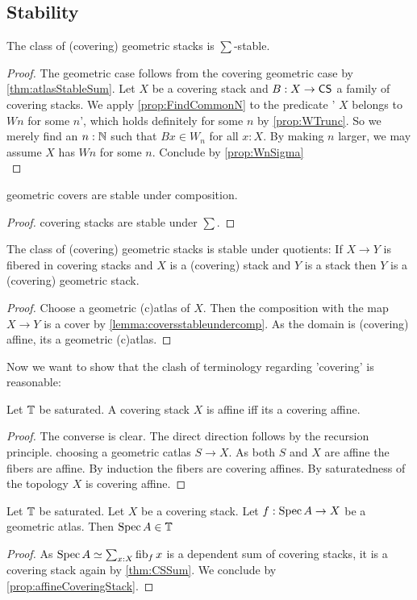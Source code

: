 \subsection{Stability}
\begin{theorem}{\label{thm:CSSum}}
	The class of (covering) geometric stacks is $\sum$-stable.
\end{theorem}
\begin{proof}
	The geometric case follows from the covering geometric case by \ref{thm:atlasStableSum}.
	Let $X$ be a covering stack and $B : X \to \mathsf{CS}$ a family of covering stacks.
	We apply \ref{prop:FindCommonN} to the predicate ' $X$ belongs to $W n$ for some $n$', which holds definitely for some $n$ by \ref{prop:WTrunc}.
	So we merely find an $n : \mathbb{N}$ such that $B x \in W_n $ for all $x : X$. By making $n$ larger, we may assume $X$ has $W n$ for some $n$. Conclude by \ref{prop:WnSigma}\\


\end{proof}
\begin{lemma}{\label{lemma:coversstableundercomp}}
	geometric covers are stable under composition.
\end{lemma}
\begin{proof}
	covering stacks are stable under $\sum$.
\end{proof}


\begin{prop}{\label{prop:stackQuot}}
	The class of (covering) geometric stacks is stable under quotients: If $X \to Y$ is fibered in covering stacks and $X$ is a (covering) stack and $Y$ is a stack then $Y$ is a (covering) geometric stack.
\end{prop}
\begin{proof}
	Choose a geometric (c)atlas of $X$. Then the composition with the map $X \to Y$ is a cover by \ref{lemma:coversstableundercomp}. As the domain is (covering) affine, its a geometric (c)atlas.
\end{proof}
Now we want to show that the clash of terminology regarding 'covering' is reasonable:


\begin{prop}{\label{prop:affineCoveringStack}}
	Let $\mathbb{T}$ be saturated.
	A covering stack $X$ is affine iff its a covering affine.
\end{prop}
\begin{proof}
	The converse is clear. The direct direction follows by the recursion principle. choosing a geometric catlas  $S \to X$. As both $S$ and $X$ are affine the fibers are affine. By induction the fibers are covering affines. By saturatedness of the topology $X$ is covering affine.
\end{proof}
\begin{lemma}{\label{lemma:atlasIsCatlas}}
	Let $\mathbb{T}$ be saturated. Let $X$ be a covering stack. Let $f : \operatorname{Spec} A \to X$ be a geometric atlas. Then $\operatorname{Spec} A \in \mathbb{T}$
\end{lemma}
\begin{proof}
	As $\operatorname{Spec} A \simeq \sum_{x : X} \operatorname{fib}_f x$ is a dependent sum of covering stacks, it is a covering stack again by \ref{thm:CSSum}. We conclude by \ref{prop:affineCoveringStack}.
\end{proof}	

